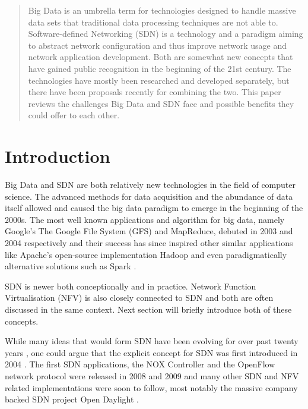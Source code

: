 \documentclass{acm_proc_article-sp}
\begin{document}
\begin{abstract}

Big Data is an umbrella term for technologies designed to handle massive data sets that traditional  data processing techniques are not able to. Software-defined Networking (SDN) is a technology and a paradigm aiming to abstract network configuration and thus improve network usage and network application development. Both are somewhat new concepts that have gained public recognition in the beginning of the 21st century. The technologies have mostly been researched and developed separately, but there have been proposals recently for combining the two. This paper reviews the challenges Big Data and SDN face and possible benefits they could offer to each other.

\end{abstract}





\section{Introduction}
Big Data and SDN are both relatively new technologies in the field of computer science. The advanced methods for data acquisition and the abundance of data itself allowed and caused the big data paradigm to emerge in the beginning of the 2000s. The most well known applications and algorithm for big data, namely Google's The Google File System (GFS) and MapReduce, debuted in 2003 and 2004 respectively \cite{Ghemawat:2003:GFS:1165389.945450,Dean:2008:MSD:1327452.1327492} and their success has since inspired other similar applications like Apache's open-source implementation Hadoop \cite{Hadoop} and even paradigmatically alternative solutions such as Spark \cite{Spark}.

SDN is newer both conceptionally and in practice. Network Function Virtualisation (NFV) is also closely connected to SDN and both are often discussed in the same context. Next section will  briefly introduce both of these concepts.

While many ideas that would form SDN have been evolving for over past twenty years \cite{Feamster:2013:RS:2559899.2560327}, one could argue that the explicit concept for SDN was first introduced in 2004 \cite{robert2012system}. The first SDN applications, the NOX Controller \cite{NOX} and the OpenFlow network protocol \cite{McKeown-CCR2008}  were released in 2008 and 2009 and many other SDN and NFV related implementations were soon to follow, most notably the massive company backed SDN project Open Daylight \cite{ODL}.
\end{document}
